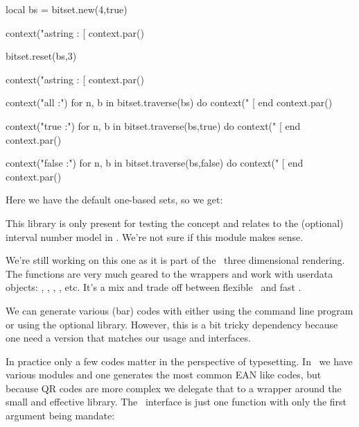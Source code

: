 local bs = bitset.new(4,true)

context("astring : [%
context.par()

bitset.reset(bs,3)

context("astring : [%
context.par()

context("all :")
for n, b in bitset.traverse(bs) do
    context(" [%
end
context.par()

context("true :")
for n, b in bitset.traverse(bs,true) do
    context(" [%
end
context.par()

context("false :")
for n, b in bitset.traverse(bs,false) do
    context(" [%
end
context.par()
\stopluacode
\stopbuffer

\typebuffer[option=TEX]

Here we have the default one-based sets, so we get:

\startlines \tttf
\getbuffer
\stoplines

\stopsection

\startsubsection[title=Interval]

This library is only present for testing the concept and relates to the
(optional) interval number model in \METAPOST. We're not sure if this module
makes sense.

\stopsection

\startsubsection[title=Z-buffers]

We're still working on this one as it is part of the \LUAMETAFUN\ three
dimensional rendering. The functions are very much geared to the wrappers and
work with userdata objects: , , ,
, etc. It's a mix and trade off between flexible \LUA\ and fast
\CCODE.

\stopsection

\startsubsection[title=QR-codes]

We can generate various (bar) codes with  either using the command
line program or using the optional library. However, this is a bit tricky
dependency because one need a version that matches our usage and interfaces.

In practice only a few codes matter in the perspective of typesetting. In
\CONTEXT\ we have various modules and one generates the most common EAN like
codes, but because QR codes are more complex we delegate that to a wrapper around
the small and effective  library. The \LUA\ interface is just
one function with only the first argument being mandate:

